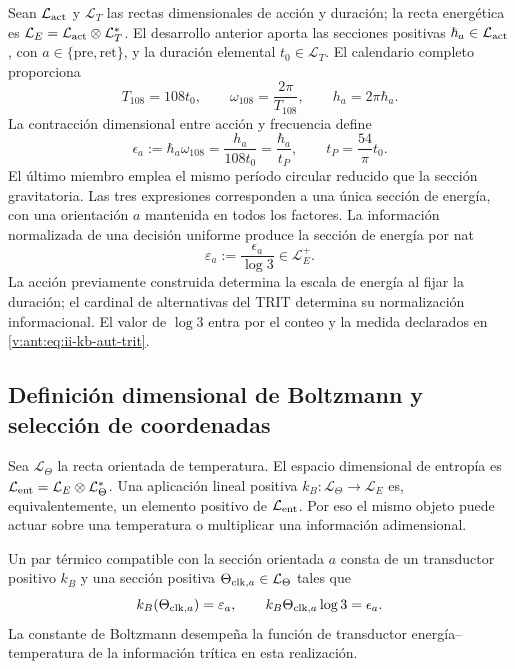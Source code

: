 Sean \(\mathcal L_{\rm act}\) y \(\mathcal L_T\) las rectas
dimensionales de acción y duración; la recta energética es
\(\mathcal L_E=\mathcal L_{\rm act}\otimes\mathcal L_T^*\).
El desarrollo anterior aporta las secciones positivas
\(\hbar_a\in\mathcal L_{\rm act}\), con
\(a\in\{\mathrm{pre},\mathrm{ret}\}\), y la duración elemental
\(t_0\in\mathcal L_T\). El calendario completo proporciona
\[
 T_{108}=108t_0,\qquad
 \omega_{108}=\frac{2\pi}{T_{108}},\qquad
 h_a=2\pi\hbar_a.
\]
La contracción dimensional entre acción y frecuencia define
\begin{equation}
 \epsilon_a:=\hbar_a\omega_{108}
 =\frac{h_a}{108t_0}
 =\frac{\hbar_a}{t_P},\qquad
 t_P=\frac{54}{\pi}t_0.
 \label{v:ant:eq:ii-kb-aut-energia}
\end{equation}
El último miembro emplea el mismo período circular reducido que la
sección gravitatoria. Las tres expresiones corresponden a una única
sección de energía, con una orientación \(a\) mantenida en todos
los factores. La información normalizada de una decisión uniforme
produce la sección de energía por nat
\begin{equation}
 \varepsilon_a:=\frac{\epsilon_a}{\log3}\in\mathcal L_E^+.
 \label{v:ant:eq:ii-kb-aut-energia-nat}
\end{equation}
La acción previamente construida determina la escala de energía al
fijar la duración; el cardinal de alternativas del TRIT determina su
normalización informacional. El valor de \(\log3\) entra por el
conteo y la medida declarados en \eqref{v:ant:eq:ii-kb-aut-trit}.

\subsection{Definición dimensional de Boltzmann y selección de coordenadas}

Sea \(\mathcal L_\Theta\) la recta orientada de temperatura.
El espacio dimensional de entropía es
\(\mathcal L_{\rm ent}=\mathcal L_E\otimes\mathcal L_\Theta^*\).
Una aplicación lineal positiva
\(k_B:\mathcal L_\Theta\to\mathcal L_E\) es, equivalentemente,
un elemento positivo de \(\mathcal L_{\rm ent}\). Por eso el mismo
objeto puede actuar sobre una temperatura o multiplicar una información
adimensional.

\begin{definition}
Un par térmico compatible con la sección orientada \(a\) consta de
un transductor positivo \(k_B\) y una sección positiva
\(\Theta_{{\rm clk},a}\in\mathcal L_\Theta\) tales que
\begin{equation}
 k_B(\Theta_{{\rm clk},a})=\varepsilon_a,
 \qquad
 k_B\Theta_{{\rm clk},a}\log3=\epsilon_a.
 \label{v:ant:eq:ii-kb-aut-par-termico}
\end{equation}
La constante de Boltzmann desempeña la función de transductor
energía--temperatura de la información trítica en esta realización.
\end{definition}

